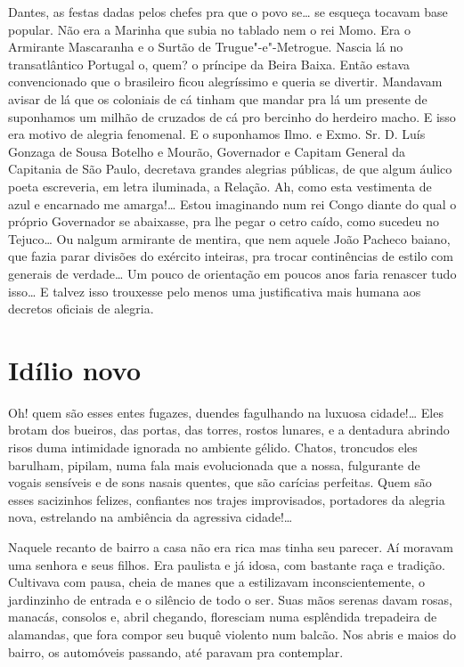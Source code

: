 Dantes, as festas dadas pelos chefes pra que o povo se\ldots{} se esqueça
tocavam base popular. Não era a Marinha que subia no tablado nem o rei
Momo. Era o Armirante Mascaranha e o Surtão de Trugue"-e"-Metrogue. Nascia
lá no transatlântico Portugal o, quem? o príncipe da Beira Baixa. Então
estava convencionado que o brasileiro ficou alegríssimo e queria se
divertir. Mandavam avisar de lá que os coloniais de cá tinham que mandar
pra lá um presente de suponhamos um milhão de cruzados de cá pro
bercinho do herdeiro macho. E isso era motivo de alegria fenomenal. E o
suponhamos Ilmo. e Exmo. Sr. D. Luís Gonzaga de Sousa Botelho e Mourão,
Governador e Capitam General da Capitania de São Paulo, decretava
grandes alegrias públicas, de que algum áulico poeta escreveria, em
letra iluminada, a Relação. Ah, como esta vestimenta de azul e encarnado
me amarga!\ldots{} Estou imaginando num rei Congo diante do qual o próprio
Governador se abaixasse, pra lhe pegar o cetro caído, como sucedeu no
Tejuco\ldots{} Ou nalgum armirante de mentira, que nem aquele João Pacheco
baiano, que fazia parar divisões do exército inteiras, pra trocar
continências de estilo com generais de verdade\ldots{} Um pouco de orientação
em poucos anos faria renascer tudo isso\ldots{} E talvez isso trouxesse pelo
menos uma justificativa mais humana aos decretos oficiais de alegria.

\chapter{Idílio novo}

Oh! quem são esses entes fugazes, duendes fagulhando na luxuosa
cidade!\ldots{} Eles brotam dos bueiros, das portas, das torres, rostos
lunares, e a dentadura abrindo risos duma intimidade ignorada no
ambiente gélido. Chatos, troncudos eles barulham, pipilam, numa fala
mais evolucionada que a nossa, fulgurante de vogais sensíveis e de sons
nasais quentes, que são carícias perfeitas. Quem são esses sacizinhos
felizes, confiantes nos trajes improvisados, portadores da alegria nova,
estrelando na ambiência da agressiva cidade!\ldots{}

Naquele recanto de bairro a casa não era rica mas tinha seu parecer. Aí
moravam uma senhora e seus filhos. Era paulista e já idosa, com bastante
raça e tradição. Cultivava com pausa, cheia de manes que a estilizavam
inconscientemente, o jardinzinho de entrada e o silêncio de todo o ser.
Suas mãos serenas davam rosas, manacás, consolos e, abril chegando,
floresciam numa esplêndida trepadeira de alamandas, que fora compor seu
buquê violento num balcão. Nos abris e maios do bairro, os automóveis
passando, até paravam pra contemplar.

